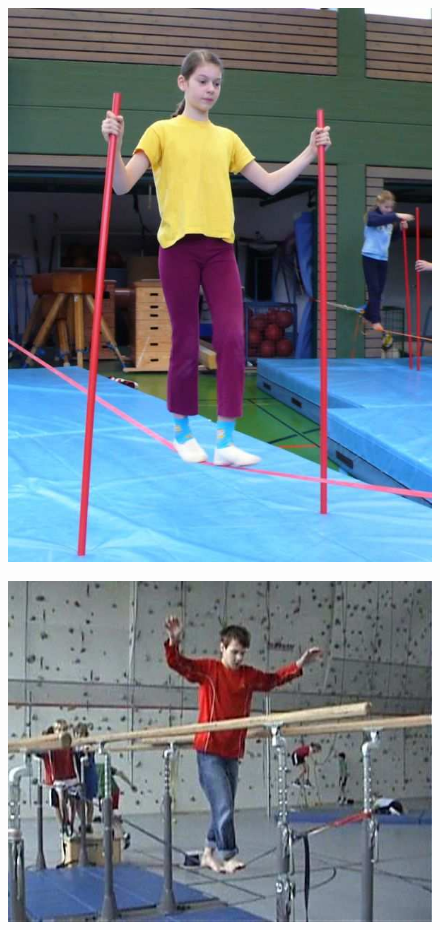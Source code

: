 \begin{figure}[htb]
	\centering
	\begin{minipage}[t]{0.23\linewidth}
		\centering
		\includegraphics[width=1\linewidth]{Pictures/slacklineHelpSticks}
		\label{fig:slacklineHelpSticks}
	\end{minipage}
	\hfill
	\begin{minipage}[t]{0.37\linewidth}
		\centering
		\includegraphics[width=1\linewidth]{Pictures/slacklineHelpBar}

\end{minipage}
\end{figure}
